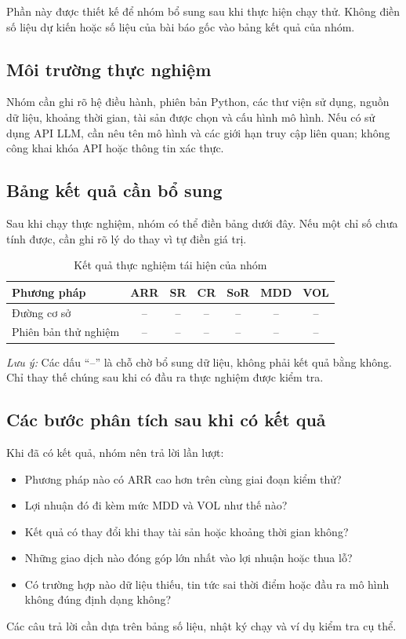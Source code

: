 Phần này được thiết kế để nhóm bổ sung sau khi thực hiện chạy thử. Không điền số liệu dự kiến hoặc số liệu của bài báo gốc vào bảng kết quả của nhóm.

\subsection{Môi trường thực nghiệm}
Nhóm cần ghi rõ hệ điều hành, phiên bản Python, các thư viện sử dụng, nguồn dữ liệu, khoảng thời gian, tài sản được chọn và cấu hình mô hình. Nếu có sử dụng API LLM, cần nêu tên mô hình và các giới hạn truy cập liên quan; không công khai khóa API hoặc thông tin xác thực.

\subsection{Bảng kết quả cần bổ sung}
Sau khi chạy thực nghiệm, nhóm có thể điền bảng dưới đây. Nếu một chỉ số chưa tính được, cần ghi rõ lý do thay vì tự điền giá trị.

\begin{table}[htbp]
\centering
\caption{Kết quả thực nghiệm tái hiện của nhóm}
\label{tab:group-results}
\begin{tabular}{lcccccc}
\toprule
Phương pháp & ARR & SR & CR & SoR & MDD & VOL \\
\midrule
Đường cơ sở & -- & -- & -- & -- & -- & -- \\
Phiên bản thử nghiệm & -- & -- & -- & -- & -- & -- \\
\bottomrule
\end{tabular}
\end{table}

\noindent\textit{Lưu ý:} Các dấu ``--'' là chỗ chờ bổ sung dữ liệu, không phải kết quả bằng không. Chỉ thay thế chúng sau khi có đầu ra thực nghiệm được kiểm tra.

\subsection{Các bước phân tích sau khi có kết quả}
Khi đã có kết quả, nhóm nên trả lời lần lượt:
\begin{itemize}
    \item Phương pháp nào có ARR cao hơn trên cùng giai đoạn kiểm thử?
    \item Lợi nhuận đó đi kèm mức MDD và VOL như thế nào?
    \item Kết quả có thay đổi khi thay tài sản hoặc khoảng thời gian không?
    \item Những giao dịch nào đóng góp lớn nhất vào lợi nhuận hoặc thua lỗ?
    \item Có trường hợp nào dữ liệu thiếu, tin tức sai thời điểm hoặc đầu ra mô hình không đúng định dạng không?
\end{itemize}
Các câu trả lời cần dựa trên bảng số liệu, nhật ký chạy và ví dụ kiểm tra cụ thể.

